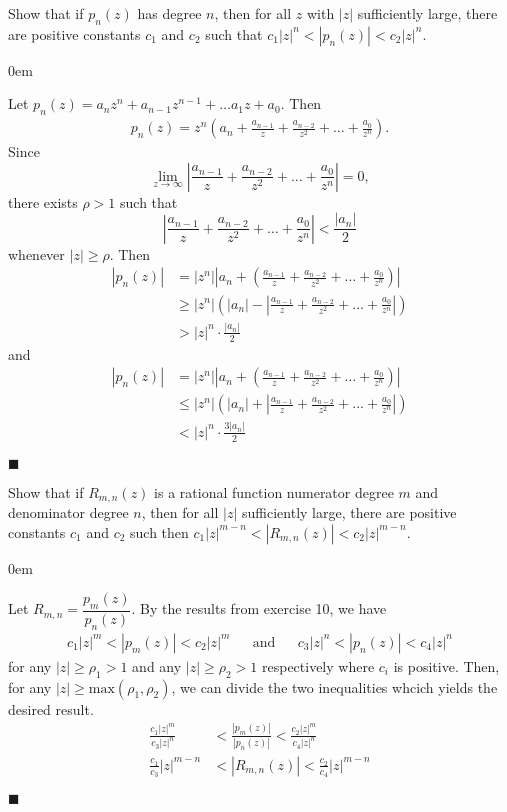 \documentclass[12pt]{article}
\author{Warren Atkison}
\date{\today}
\renewcommand{\qed}{\hfill$\blacksquare$}
\renewenvironment{proof}{\vspace{1em}\begin{addmargin}[2em]{0em}\begin{newproof}}{\end{newproof}\end{addmargin}\qed}
\newenvironment{exercise}[2][Exercise]{\begin{trivlist}
\item[\hskip \labelsep {\bfseries #1} \hskip \labelsep {\bfseries #2.}]}{\end{trivlist}}
\begin{document}
\fancyhf{}
\fancyhead[R]{\today}
\fancyfoot[R]{\thepage}

\begin{exercise}{10}
	Show that if $p_n(z)$ has degree $n$, then for all $z$ with $|z|$ sufficiently large, there are positive constants $c_1$ and $c_2$ such that $c_1|z|^n < |p_n(z)| < c_2|z|^n$.
\end{exercise}
\begin{proof}
	Let $p_n(z) = a_nz^n + a_{n-1}z^{n-1} + \ldots a_1z + a_0$. Then 
	\begin{align*}
		p_n(z) = z^n(a_n + \frac{a_{n-1}}{z} + \frac{a_{n-2}}{z^2} + \ldots + \frac{a_0}{z^n}).	
	\end{align*}
	Since
	\[
		\lim_{z \to \infty} \left|\frac{a_{n-1}}{z} + \frac{a_{n-2}}{z^2} + \ldots + \frac{a_0}{z^n}\right| = 0,
	\]
	there exists $\rho>1$ such that
	\[
		\left|\frac{a_{n-1}}{z} + \frac{a_{n-2}}{z^2} + \ldots + \frac{a_0}{z^n}\right| < \frac{|a_n|}{2}
	\]
	whenever $|z| \ge \rho$. Then
	\begin{align*}
		|p_n(z)| &= |z^n|\left|a_n + \left(\frac{a_{n-1}}{z} + \frac{a_{n-2}}{z^2} + \ldots + \frac{a_0}{z^n}\right)\right| \\
			 &\ge |z^n|\left(|a_n| - \left|\frac{a_{n-1}}{z} + \frac{a_{n-2}}{z^2} + \ldots + \frac{a_0}{z^n}\right| \right) \\
			 &> |z|^n \cdot \frac{|a_n|}{2}
	\end{align*}
	and
	\begin{align*}
		|p_n(z)| &= |z^n|\left|a_n + \left(\frac{a_{n-1}}{z} + \frac{a_{n-2}}{z^2} + \ldots + \frac{a_0}{z^n}\right)\right| \\
			 &\le |z^n|\left(|a_n| + \left|\frac{a_{n-1}}{z} + \frac{a_{n-2}}{z^2} + \ldots + \frac{a_0}{z^n}\right| \right) \\
			 &< |z|^n \cdot \frac{3|a_n|}{2}	
	\end{align*}
\end{proof}
\newpage
\begin{exercise}{16}
	Show that if $R_{m,n}(z)$ is a rational function numerator degree $m$ and denominator degree $n$, then for all $|z|$ sufficiently large, there are positive constants $c_1$ and $c_2$ such then $c_1|z|^{m-n} < |R_{m,n}(z)| < c_2|z|^{m-n}$.
	\begin{proof}
		Let $R_{m,n} = \dfrac{p_m(z)}{p_n(z)}$. By the results from exercise 10, we have
		\begin{align*}
			c_1|z|^m < |p_m(z)| < c_2|z|^m &&\text{and}&& c_3|z|^n < |p_n(z)| < c_4|z|^n
		\end{align*}
		for any $|z| \ge \rho_1 > 1$ and any $|z| \ge \rho_2 > 1$ respectively where $c_i$ is positive. Then, for any $|z| \ge \text{max}(\rho_1,\rho_2)$, we can divide the two inequalities whcich yields the desired result.
		\begin{align*}
			\frac{c_1|z|^m}{c_3|z|^n} &< \frac{|p_m(z)|}{|p_n(z)|} < \frac{c_2|z|^m}{c_4|z|^n} \\
			\frac{c_1}{c_3}|z|^{m-n} &< |R_{m,n}(z)| < \frac{c_2}{c_4}|z|^{m-n}
		\end{align*}
	\end{proof}
\end{exercise}
\end{document}
